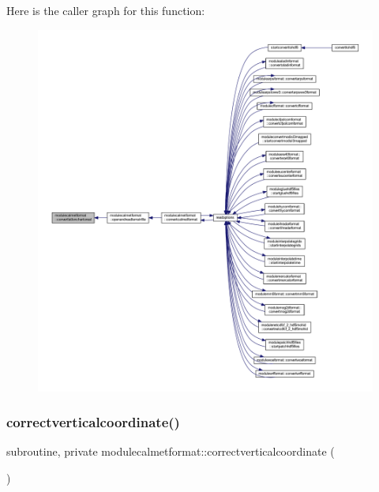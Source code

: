 Here is the caller graph for this function\+:\nopagebreak
\begin{figure}[H]
\begin{center}
\leavevmode
\includegraphics[width=350pt]{namespacemodulecalmetformat_a4d48e68e591262be2fdee84257034418_icgraph}
\end{center}
\end{figure}
\mbox{\label{namespacemodulecalmetformat_aebd4c52189e33c42d4eddb372d91a66d}} 
\subsubsection{\texorpdfstring{correctverticalcoordinate()}{correctverticalcoordinate()}}
{\footnotesize\ttfamily subroutine, private modulecalmetformat\+::correctverticalcoordinate (\begin{DoxyParamCaption}{ }\end{DoxyParamCaption})\hspace{0.3cm}{\ttfamily [private]}}

